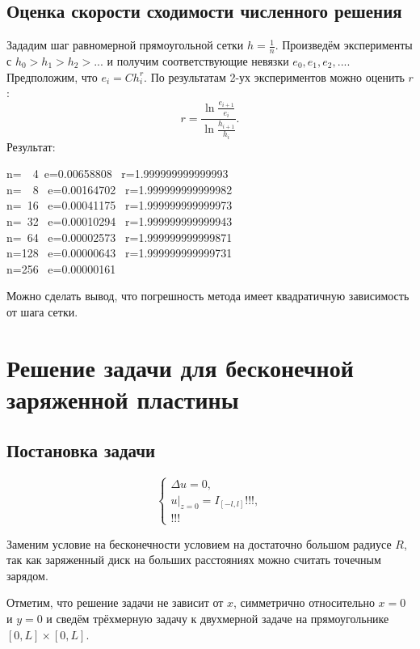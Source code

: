 \documentclass{report}
\begin{document}
\section{Оценка скорости сходимости численного решения}
Зададим шаг равномерной прямоугольной сетки $h=\frac{1}{n}$. Произведём эксперименты с $h_0>h_1>h_2>...$ и получим соответствующие невязки $e_0, e_1, e_2, ...$. Предположим, что $e_i=Ch_i^r$. По результатам 2-ух экспериментов можно оценить $r$:
\begin{equation}
	r = \frac{\ln{\frac{e_{i+1}}{e_i}}}{\ln{\frac{h_{i+1}}{h_i}}}.
\end{equation}
Результат:\\
\begin{center}
	n=~~4~e=0.00658808 ~r=1.999999999999993\\
	n=~~8~ e=0.00164702~ r=1.999999999999982\\
	n=~16 ~e=0.00041175~ r=1.999999999999973\\
	n=~32 ~e=0.00010294~ r=1.999999999999943\\
	n=~64 ~e=0.00002573~ r=1.999999999999871\\
	n=128 ~e=0.00000643~ r=1.999999999999731\\
	n=256 ~e=0.00000161
\end{center}
Можно сделать вывод, что погрешность метода имеет квадратичную зависимость от шага сетки.

\chapter{Решение задачи для бесконечной заряженной пластины}
\section{Постановка задачи}
\begin{equation}
	\begin{cases}
		\Delta u = 0,\\
		u|_{z=0}=I_{[-l,l]}!!!,\\
		!!!
	\end{cases}
\end{equation}

Заменим условие на бесконечности условием на достаточно большом радиусе $R$, так как заряженный диск на больших расстояниях можно считать точечным зарядом.

Отметим, что решение задачи не зависит от $x$, симметрично относительно $x=0$ и $y=0$ и сведём трёхмерную задачу к двухмерной задаче на прямоугольнике $[0, L]\times[0, L]$.
\end{document}
